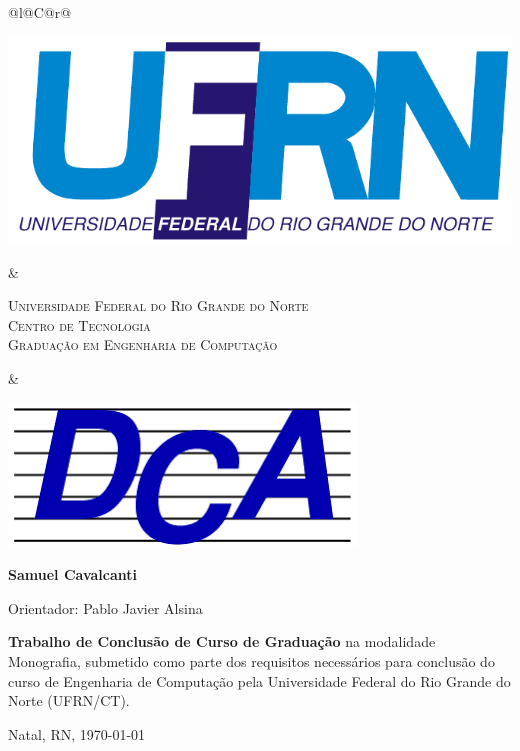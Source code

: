 %
%

\begin{titlepage}

\begin{center}

\small

\begin{tabularx}{\linewidth}{@{}l@{}C@{}r@{}}
\parbox[c]{3cm}{\includegraphics[width=\linewidth]{./figuras/UFRN}} &
\begin{center}
\textsf{\textsc{Universidade Federal do Rio Grande do Norte\\
Centro de Tecnologia\\
Graduação em Engenharia de Computação}}
\end{center} &
\parbox[c]{3cm}{\includegraphics[width=\linewidth]{./figuras/dca_logo.png}}
\end{tabularx}

\vfill
\LARGE
\textbf{\tccTitle}
\vfill
\Large
\textbf{Samuel Cavalcanti}
\vfill

\normalsize

Orientador: Pablo Javier Alsina

\vfill

\hfill
\parbox{0.5\linewidth}{\textbf{%
Trabalho de Conclusão de Curso de Graduação} na modalidade Monografia, 
submetido como parte dos requisitos necessários para 
conclusão do curso de Engenharia de Computação pela 
Universidade Federal do Rio Grande do Norte (UFRN/CT).
}

\vfill

\large

Natal, RN, \today

\end{center}

\end{titlepage}
